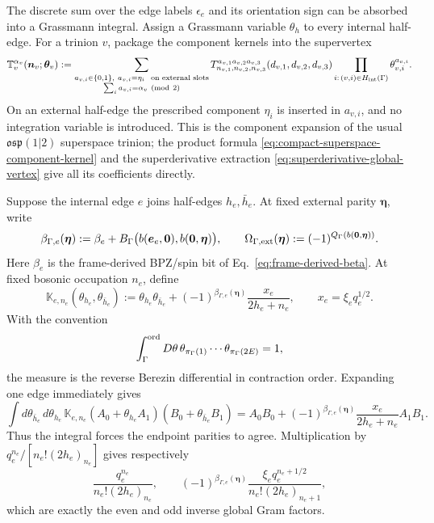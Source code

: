 \documentclass[11pt]{article}
\newcommand{\osp}{\mathfrak{osp}(1|2)}
\begin{document}
The discrete sum over the edge labels \(\epsilon_e\) and its orientation sign
can be absorbed into a Grassmann integral.  Assign a Grassmann variable
\(\theta_h\) to every internal half-edge.  For a trinion \(v\), package the
component kernels into the supervertex
\begin{equation}
 \mathbb T_v^{\alpha_v}(\bm n_v;\bm\theta_v)
 :=\sum_{\substack{a_{v,i}\in\{0,1\},\
             a_{v,i}=\eta_i\ \text{ on external slots}\\
             \sum_i a_{v,i}=\alpha_v\ ({\rm mod}\ 2)}}
 T_{n_{v,1},n_{v,2},n_{v,3}}^
  {a_{v,1}a_{v,2}a_{v,3}}
 (d_{v,1},d_{v,2},d_{v,3})
 \prod_{i:\,(v,i)\in H_{\rm int}(\Gamma)}
 \theta_{v,i}^{a_{v,i}}.
 \label{eq:osp-supervertex}
\end{equation}
On an external half-edge the prescribed component \(\eta_i\) is inserted
in \(a_{v,i}\), and no integration variable is introduced.  This is the
component expansion of the usual \(\osp\) superspace trinion; the
product formula \eqref{eq:compact-superspace-component-kernel} and the
superderivative extraction \eqref{eq:superderivative-global-vertex} give all
its coefficients directly.

Suppose the internal edge \(e\) joins half-edges \(h_e,\bar h_e\).  At fixed
external parity \(\bm\eta\), write
\begin{equation}
 \beta_{\Gamma,e}(\bm\eta)
 :=\beta_e+B_\Gamma\bigl(b(\bm e_e,\bm0),
                         b(\bm0,\bm\eta)\bigr),
 \qquad
 \Omega_{\Gamma,{\rm ext}}(\bm\eta)
 :=(-1)^{Q_\Gamma(b(\bm0,\bm\eta))}.
 \label{eq:external-berezin-orientation-data}
\end{equation}
Here \(\beta_e\) is the frame-derived BPZ/spin bit of
Eq.~\eqref{eq:frame-derived-beta}.  At fixed bosonic occupation
\(n_e\), define
\begin{equation}
 \mathbb K_{e,n_e}(\theta_{h_e},\theta_{\bar h_e})
 :=\theta_{h_e}\theta_{\bar h_e}
   +(-1)^{\beta_{\Gamma,e}(\bm\eta)}
    \frac{x_e}{2h_e+n_e},
 \qquad x_e=\xi_e q_e^{1/2}.
 \label{eq:osp-berezin-edge-kernel}
\end{equation}
With the convention
\begin{equation}
 \int_\Gamma^{\rm ord}D\theta\,
 \theta_{\pi_\Gamma(1)}\cdots\theta_{\pi_\Gamma(2E)}=1,
 \label{eq:ordered-berezin-measure}
\end{equation}
the measure is the reverse Berezin differential in contraction order.
Expanding one edge immediately gives
\begin{equation}
 \int d\theta_{\bar h_e}\,d\theta_{h_e}\,
 \mathbb K_{e,n_e}
 (A_0+\theta_{h_e}A_1)
 (B_0+\theta_{\bar h_e}B_1)
 =A_0B_0+(-1)^{\beta_{\Gamma,e}(\bm\eta)}
   \frac{x_e}{2h_e+n_e}A_1B_1.
 \label{eq:single-edge-berezin-contraction}
\end{equation}
Thus the integral forces the endpoint parities to agree.  Multiplication by
\(q_e^{n_e}/[n_e!(2h_e)_{n_e}]\) gives respectively
\begin{equation}
 \frac{q_e^{n_e}}{n_e!(2h_e)_{n_e}},
 \qquad
 (-1)^{\beta_{\Gamma,e}(\bm\eta)}
 \frac{\xi_e q_e^{n_e+1/2}}
      {n_e!(2h_e)_{n_e+1}},
 \label{eq:berezin-even-odd-norms}
\end{equation}
which are exactly the even and odd inverse global Gram factors.
\end{document}
